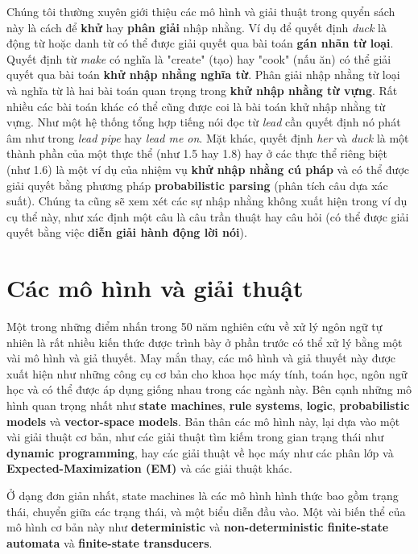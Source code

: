 Chúng tôi thường xuyên giới thiệu các mô hình và giải thuật trong quyển sách này là cách để \textbf{khử} hay \textbf{phân giải} nhập nhằng. Ví dụ để quyết định \textit{duck} là động từ hoặc danh từ có thể được giải quyết qua bài toán \textbf{gán nhãn từ loại}. Quyết định từ \textit{make} có nghĩa là "create" (tạo) hay "cook" (nấu ăn) có thể giải quyết qua bài toán \textbf{khử nhập nhằng nghĩa từ}. Phân giải nhập nhằng từ loại và nghĩa từ là hai bài toán quan trọng trong \textbf{khử nhập nhằng từ vựng}. Rất nhiều các bài toán khác có thể cũng được coi là bài toán khử nhập nhằng từ vựng. Như một hệ thống tổng hợp tiếng nói đọc từ \textit{lead} cần quyết định nó phát âm như trong \textit{lead pipe} hay \textit{lead me on}. Mặt khác, quyết định \textit{her} và \textit{duck} là một thành phần của một thực thể (như 1.5 hay 1.8) hay ở các thực thể riêng biệt (như 1.6) là một ví dụ của nhiệm vụ \textbf{khử nhập nhằng cú pháp} và có thể được giải quyết bằng phương pháp \textbf{probabilistic parsing} (phân tích câu dựa xác suất). Chúng ta cũng sẽ xem xét các sự nhập nhằng không xuất hiện trong ví dụ cụ thể này, như xác định một câu là câu trần thuật hay câu hỏi (có thể được giải quyết bằng việc \textbf{diễn giải hành động lời nói}).

\section{Các mô hình và giải thuật}

Một trong những điểm nhấn trong 50 năm nghiên cứu về xử lý ngôn ngữ tự nhiên là rất nhiều kiến thức được trình bày ở phần trước có thể xử lý bằng một vài mô hình và giả thuyết. May mắn thay, các mô hình và giả thuyết này được xuất hiện như những công cụ cơ bản cho khoa học máy tính, toán học, ngôn ngữ học và có thể được áp dụng giống nhau trong các ngành này. Bên cạnh những mô hình quan trọng nhất như \textbf{state machines}, \textbf{rule systems}, \textbf{logic}, \textbf{probabilistic models} và \textbf{vector-space models}. Bản thân các mô hình này, lại dựa vào một vài giải thuật cơ bản, như các giải thuật tìm kiếm trong gian trạng thái như \textbf{dynamic programming}, hay các giải thuật về học máy như các phân lớp và \textbf{Expected-Maximization (EM)} và các giải thuật khác.

Ở dạng đơn giản nhất, state machines là các mô hình hình thức bao gồm trạng thái, chuyển giữa các trạng thái, và một biểu diễn đầu vào. Một vài biến thể của mô hình cơ bản này như \textbf{deterministic} và \textbf{non-deterministic finite-state automata} và \textbf{finite-state transducers}.

